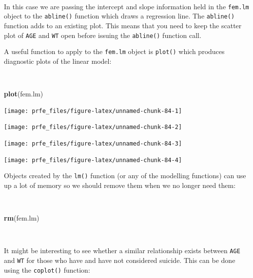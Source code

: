 \documentclass[12pt,a4paper]{book}
\newenvironment{Shaded}{\begin{snugshade}}{\end{snugshade}}
\newcommand{\KeywordTok}[1]{\textcolor[rgb]{0.13,0.29,0.53}{\textbf{#1}}}
\newcommand{\NormalTok}[1]{#1}
\theoremstyle{definition}
\theoremstyle{definition}
\theoremstyle{definition}
\theoremstyle{remark}
\begin{document}
~

In this case we are passing the intercept and slope information held in
the \texttt{fem.lm} object to the \texttt{abline()} function which draws
a regression line. The \texttt{abline()} function adds to an existing
plot. This means that you need to keep the scatter plot of \texttt{AGE}
and \texttt{WT} open before issuing the \texttt{abline()} function call.

\newpage

A useful function to apply to the \texttt{fem.lm} object is
\texttt{plot()} which produces diagnostic plots of the linear model:

~

\begin{Shaded}
\begin{Highlighting}[]
\KeywordTok{plot}\NormalTok{(fem.lm)}
\end{Highlighting}
\end{Shaded}

\begin{center}\texttt{[image: prfe\_files/figure-latex/unnamed-chunk-84-1]} \end{center}

\begin{center}\texttt{[image: prfe\_files/figure-latex/unnamed-chunk-84-2]} \end{center}

\begin{center}\texttt{[image: prfe\_files/figure-latex/unnamed-chunk-84-3]} \end{center}

\begin{center}\texttt{[image: prfe\_files/figure-latex/unnamed-chunk-84-4]} \end{center}

\newpage

Objects created by the \texttt{lm()} function (or any of the modelling
functions) can use up a lot of memory so we should remove them when we
no longer need them:

~

\begin{Shaded}
\begin{Highlighting}[]
\KeywordTok{rm}\NormalTok{(fem.lm)}
\end{Highlighting}
\end{Shaded}

~

It might be interesting to see whether a similar relationship exists
between \texttt{AGE} and \texttt{WT} for those who have and have not
considered suicide. This can be done using the \texttt{coplot()}
function:
\end{document}
